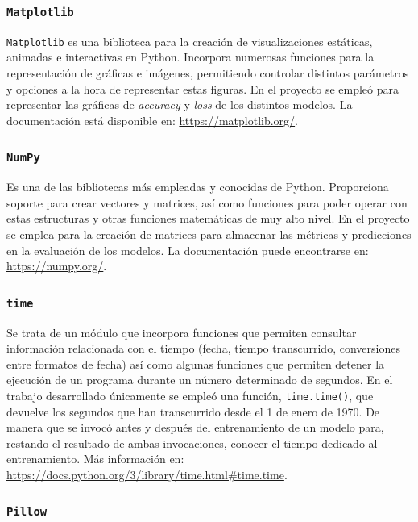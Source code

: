 \subsubsection{\texttt{Matplotlib}}

\texttt{Matplotlib} es una biblioteca para la creación de visualizaciones estáticas, animadas e interactivas en Python. Incorpora numerosas funciones para la representación de gráficas e imágenes, permitiendo controlar distintos parámetros y opciones a la hora de representar estas figuras. En el proyecto se empleó para representar las gráficas de \textit{accuracy} y \textit{loss} de los distintos modelos. La documentación está disponible en: \url{https://matplotlib.org/}.

\subsubsection{\texttt{NumPy}}

Es una de las bibliotecas más empleadas y conocidas de Python. Proporciona soporte para crear vectores y matrices, así como funciones para poder operar con estas estructuras y otras funciones matemáticas de muy alto nivel. En el proyecto se emplea para la creación de matrices para almacenar las métricas y predicciones en la evaluación de los modelos. La documentación puede encontrarse en: \url{https://numpy.org/}.

\subsubsection{\texttt{time}}

Se trata de un módulo que incorpora funciones que permiten consultar información relacionada con el tiempo (fecha, tiempo transcurrido, conversiones entre formatos de fecha) así como algunas funciones que permiten detener la ejecución de un programa durante un número determinado de segundos. En el trabajo desarrollado únicamente se empleó una función, \texttt{time.time()}, que devuelve los segundos que han transcurrido desde el 1 de enero de 1970. De manera que se invocó antes y después del entrenamiento de un modelo para, restando el resultado de ambas invocaciones, conocer el tiempo dedicado al entrenamiento. Más información en: \url{https://docs.python.org/3/library/time.html#time.time}.

\subsubsection{\texttt{Pillow}}

